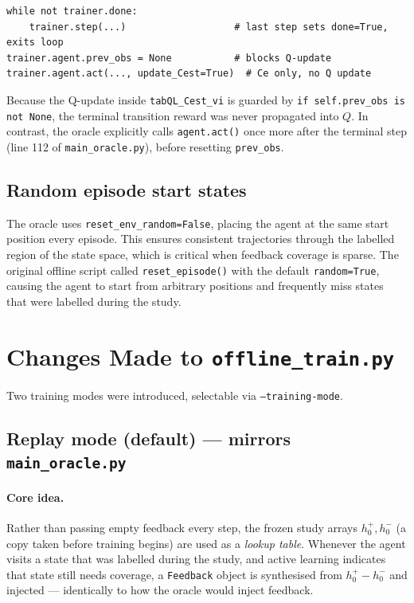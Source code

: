 \documentclass[11pt, a4paper]{article}
\begin{document}
\begin{lstlisting}
while not trainer.done:
    trainer.step(...)                   # last step sets done=True, exits loop
trainer.agent.prev_obs = None           # blocks Q-update
trainer.agent.act(..., update_Cest=True)  # Ce only, no Q update
\end{lstlisting}

Because the Q-update inside \texttt{tabQL\_Cest\_vi} is guarded by
\texttt{if self.prev\_obs is not None}, the terminal transition reward was
never propagated into $Q$.  In contrast, the oracle explicitly calls
\texttt{agent.act()} once more after the terminal step (line 112 of
\texttt{main\_oracle.py}), before resetting \texttt{prev\_obs}.

\subsection{Random episode start states}

The oracle uses \texttt{reset\_env\_random=False}, placing the agent at the
same start position every episode.  This ensures consistent trajectories
through the labelled region of the state space, which is critical when
feedback coverage is sparse.  The original offline script called
\texttt{reset\_episode()} with the default \texttt{random=True}, causing
the agent to start from arbitrary positions and frequently miss states that
were labelled during the study.

\section{Changes Made to \texttt{offline\_train.py}}
\label{sec:changes}

Two training modes were introduced, selectable via \texttt{--training-mode}.

\subsection{Replay mode (default) — mirrors \texttt{main\_oracle.py}}

\paragraph{Core idea.}
Rather than passing empty feedback every step, the frozen study arrays
$h^+_0, h^-_0$ (a copy taken before training begins) are used as a
\emph{lookup table}.  Whenever the agent visits a state that was labelled
during the study, and active learning indicates that state still needs
coverage, a \texttt{Feedback} object is synthesised from $h^+_0 - h^-_0$
and injected — identically to how the oracle would inject feedback.
\end{document}
